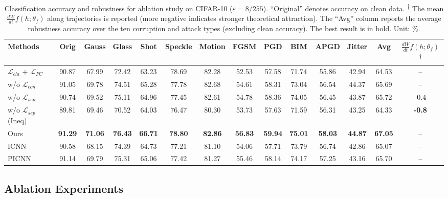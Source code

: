 \documentclass[journal]{IEEEtran}
\begin{document}
\begin{table}[ht]
	\centering
	\caption{Classification accuracy and robustness for ablation study on CIFAR-10 ($\varepsilon=8/255$). ``Original'' denotes accuracy on clean data. \textsuperscript{†} The mean $\frac{dW}{dt}f(h;\theta_f)$ along trajectories is reported (more negative indicates stronger theoretical attraction). The ``Avg'' column reports the average robustness accuracy over the ten corruption and attack types (excluding clean accuracy). The best result is in bold. Unit: \%. } 
	\label{table:ab1}
	\begin{tabular}{lccccccccccccc}
		\toprule
		\textbf{Methods} & \textbf{Orig} & \textbf{Gauss} & \textbf{Glass} & \textbf{Shot} & \textbf{Speckle} & \textbf{Motion} & \textbf{FGSM} & \textbf{PGD} & \textbf{BIM} & \textbf{APGD} & \textbf{Jitter} & \textbf{Avg} & \textbf{$\frac{dW}{dt}f(h;\theta_f)$\textsuperscript{†}} \\ \midrule
		
		$\mathcal{L}_{cla}$ + $\mathcal{L}_{FC}$  & 90.87 & 67.99 & 72.42 & 63.23 & 78.69 & 82.28 & 52.53 & 57.58 & 71.74 & 55.86 & 42.94 & 64.53 & -- \\
		w/o $\mathcal{L}_{con}$ & 91.05 & 69.78 & 74.51 & 65.28 & 77.78 & 82.68 & 54.61 & 58.31 & 73.04 & 56.54 & 44.37 & 65.69 & -- \\ 
		w/o $\mathcal{L}_{sep}$ & 90.74 & 69.52 & 75.11 & 64.96 & 77.45 & 82.61 & 54.78 & 58.36 & 74.05 & 56.45 & 43.87 & 65.72 & -0.4 \\
		w/o $\mathcal{L}_{sep}$ (Ineq) & 89.81 & 69.46 & 70.52 & 64.03 & 76.47 & 80.30 & 53.73 & 57.63 & 71.59 & 56.31 & 43.25 & 64.33   & \textbf{-0.8} \\ \midrule
		Ours & \textbf{91.29} & \textbf{71.06} & \textbf{76.43} & \textbf{66.71} & \textbf{78.80} & \textbf{82.86} & \textbf{56.83} & \textbf{59.94} & \textbf{75.01} & \textbf{58.03} & \textbf{44.87} & \textbf{67.05} &  --\\  \midrule
		ICNN  & 90.58 & 68.15 & 74.39 & 64.73 & 77.21 & 81.10 & 54.06 & 57.71 & 73.79 & 56.74 & 42.86 & 65.07 & --\\
		PICNN  & 91.14 & 69.79 & 75.31 & 65.06 & 77.42 & 81.27 & 55.46 & 58.14 & 74.17 & 57.25 & 43.16 & 65.70 & --\\ 
		\bottomrule   
	\end{tabular}
\end{table}

\subsection{Ablation Experiments}
\end{document}
